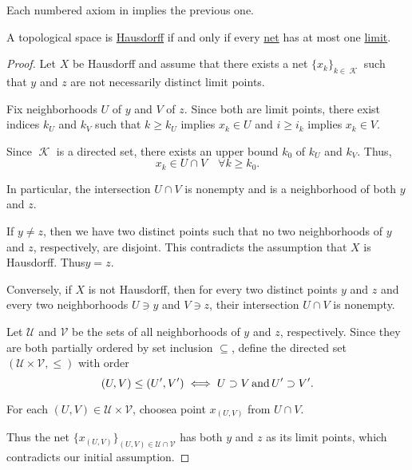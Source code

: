 \begin{proposition}\label{thm:separation_axioms_cascade}
  Each numbered axiom in  implies the previous one.
\end{proposition}

\begin{proposition}\label{thm:t2_iff_singleton_limits}
  A topological space is \hyperref[def:separation_axioms/T2]{Hausdorff} if and only if every \hyperref[def:topological_net]{net} has at most one \hyperref[def:net_convergence/limit]{limit}.
\end{proposition}
\begin{proof}
  \SufficiencySubProof Let \( X \) be Hausdorff and assume that there exists a net \( \{ x_k \}_{k \in \mscrK} \) such that \( y \) and \( z \) are not necessarily distinct limit points.

  Fix neighborhoods \( U \) of \( y \) and \( V \) of \( z \). Since both are limit points, there exist indices \( k_U \) and \( k_V \) such that \( k \geq k_U \) implies \( x_k \in U \) and \( i \geq i_k \) implies \( x_k \in V \).

  Since \( \mscrK \) is a directed set, there exists an upper bound \( k_0 \) of \( k_U \) and \( k_V \). Thus,
  \begin{equation*}
    x_k \in U \cap V \quad\forall k \geq k_0.
  \end{equation*}

  In particular, the intersection \( U \cap V \) is nonempty and is a neighborhood of both \( y \) and \( z \).

  If \( y \neq z \), then we have two distinct points such that no two neighborhoods of \( y \) and \( z \), respectively, are disjoint. This contradicts the assumption that \( X \) is Hausdorff. Thus\LEM \( y = z \).

  \NecessitySubProof Conversely, if \( X \) is not Hausdorff\LEM, then for every two distinct points \( y \) and \( z \) and every two neighborhoods \( U \ni y \) and \( V \ni z \), their intersection \( U \cap V \) is nonempty.

  Let \( \mathcal{U} \) and \( \mathcal{V} \) be the sets of all neighborhoods of \( y \) and \( z \), respectively. Since they are both partially ordered by set inclusion \( \subseteq \), define the directed set \( (\mathcal{U} \times \mathcal{V}, \leq) \) with order
  \begin{equation*}
    (U, V) \leq (U', V') \iff U \supset V \mathop{\text{and}} U' \supset V'.
  \end{equation*}

  For each \( (U, V) \in \mathcal{U} \times \mathcal{V} \), choose\AOC a point \( x_{(U, V)} \) from \( U \cap V \).

  Thus the net \( \{ x_{(U, V)} \}_{(U, V) \in \mathcal{U} \cap \mathcal{V}} \) has both \( y \) and \( z \) as its limit points, which contradicts our initial assumption.
\end{proof}

